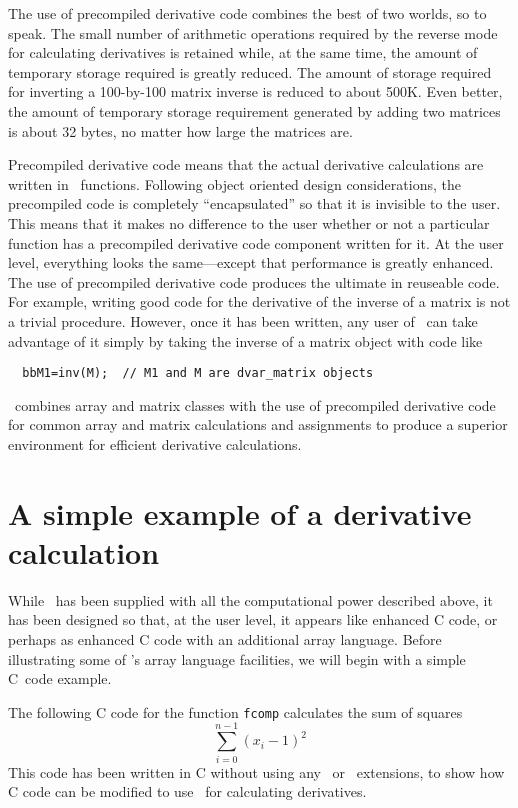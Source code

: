 \documentclass{admbmanual}
\begin{document}
The use of precompiled derivative code combines the best of two worlds, so to
speak. The small number of arithmetic operations required by the reverse mode
for calculating derivatives is retained while, at the same time, the amount of
temporary storage required is greatly reduced. The amount of storage required
for inverting a 100-by-100 matrix inverse is reduced to about 500K. Even better,
the amount of temporary storage requirement generated by adding two matrices is
about 32 bytes, no matter how large the matrices are.

Precompiled derivative code means that the actual derivative calculations are
written in \cplus\ functions. Following object oriented design considerations,
the precompiled code is completely ``encapsulated'' so that it is invisible to
the user. This means that it makes no difference to the user whether or not a
particular function has a precompiled derivative code component written for it.
At the user level, everything looks the same---except that performance is
greatly enhanced. The use of precompiled derivative code produces the ultimate
in reuseable code. For example, writing good code for the derivative of the
inverse of a matrix is not a trivial procedure. However, once it has been
written, any user of \scAD\ can take advantage of it simply by taking the
inverse of a matrix object with code like
\begin{lstlisting}
  bbM1=inv(M);  // M1 and M are dvar_matrix objects
\end{lstlisting}

\scAD\ combines array and matrix classes with the use of precompiled derivative
code for common array and matrix calculations and assignments to produce a
superior environment for efficient derivative calculations.

\section{A simple example of a derivative calculation}

While \scAD\ has been supplied with all the computational power described above,
it has been designed so that, at the user level, it appears like enhanced C
code, or perhaps as enhanced C code with an additional array language. Before
illustrating some of \scAD's array language facilities, we will begin with a
simple C~code example.

The following C code for the function \texttt{fcomp}
calculates the sum of squares
\begin{equation*}
  \sum_{i=0}^{n-1} (x_i-1)^2
\end{equation*}
This code has been written in C without using any \cplus\ or \scAD\ extensions,
to show how C code can be modified to use \scAD\ for calculating derivatives.
\end{document}
